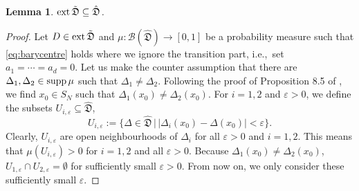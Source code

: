\documentclass[12pt,a4paper,reqno]{amsart}
\newtheorem{lemma}[proposition]{Lemma}
\theoremstyle{definition}
\newcommand{\mc}[1]{\mathcal{#1}}
\newcommand{\mf}[1]{\mathfrak{#1}}
\begin{document}
\begin{lemma}\label{lemma:extlemma}
${\rm ext}\,\tilde{\mf D}\subseteq\hat{\mf D}$.
\end{lemma}

\begin{proof}
Let $D\in{\rm ext}\,\tilde{\mf D}$ and $\mu:\mc B(\hat{\mf D})\to[0,1]$ be a probability measure such that \eqref{eq:barycentre} holds where we ignore the transition part, i.e.,\ set $a_1=\cdots=a_d=0$. Let us make the counter assumption that there are $\Delta_1,\Delta_2\in{\rm supp}\,\mu$ such that $\Delta_1\neq\Delta_2$. Following the proof of Proposition 8.5 of \cite{FritzII}, we find $x_0\in S_N$ such that $\Delta_1(x_0)\neq\Delta_2(x_0)$. For $i=1,2$ and $\varepsilon>0$, we define the subsets $U_{i,\varepsilon}\subseteq\hat{\mf D}$,
$$
U_{i,\varepsilon}:=\{\Delta\in\hat{\mf D}\,|\,|\Delta_i(x_0)-\Delta(x_0)|<\varepsilon\}.
$$
Clearly, $U_{i,\varepsilon}$ are open neighbourhoods of $\Delta_i$ for all $\varepsilon>0$ and $i=1,2$. This means that $\mu(U_{i,\varepsilon})>0$ for $i=1,2$ and all $\varepsilon>0$. Because $\Delta_1(x_0)\neq\Delta_2(x_0)$, $U_{1,\varepsilon}\cap U_{2,\varepsilon}=\emptyset$ for sufficiently small $\varepsilon>0$. From now on, we only consider these sufficiently small $\varepsilon$.


\end{proof}
\end{document}
